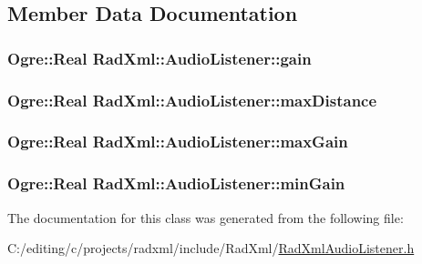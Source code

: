 \subsection{Member Data Documentation}
\hypertarget{class_rad_xml_1_1_audio_listener_aafa1c832d575154d1bcaf8366f7c199b}{
\subsubsection[{gain}]{\setlength{\rightskip}{0pt plus 5cm}Ogre\-::\-Real Rad\-Xml\-::\-Audio\-Listener\-::gain}}\label{class_rad_xml_1_1_audio_listener_aafa1c832d575154d1bcaf8366f7c199b}
\hypertarget{class_rad_xml_1_1_audio_listener_a0ab65c8cc830151adfceccde66cd5a1f}{
\subsubsection[{max\-Distance}]{\setlength{\rightskip}{0pt plus 5cm}Ogre\-::\-Real Rad\-Xml\-::\-Audio\-Listener\-::max\-Distance}}\label{class_rad_xml_1_1_audio_listener_a0ab65c8cc830151adfceccde66cd5a1f}
\hypertarget{class_rad_xml_1_1_audio_listener_a957efe7e509c52736607c519897a3d34}{
\subsubsection[{max\-Gain}]{\setlength{\rightskip}{0pt plus 5cm}Ogre\-::\-Real Rad\-Xml\-::\-Audio\-Listener\-::max\-Gain}}\label{class_rad_xml_1_1_audio_listener_a957efe7e509c52736607c519897a3d34}
\hypertarget{class_rad_xml_1_1_audio_listener_a8efee7a058a2eea2a25b57e9e1956e07}{
\subsubsection[{min\-Gain}]{\setlength{\rightskip}{0pt plus 5cm}Ogre\-::\-Real Rad\-Xml\-::\-Audio\-Listener\-::min\-Gain}}\label{class_rad_xml_1_1_audio_listener_a8efee7a058a2eea2a25b57e9e1956e07}


The documentation for this class was generated from the following file\-:\begin{DoxyCompactItemize}
\item 
C\-:/editing/c/projects/radxml/include/\-Rad\-Xml/\hyperlink{_rad_xml_audio_listener_8h}{Rad\-Xml\-Audio\-Listener.\-h}\end{DoxyCompactItemize}
